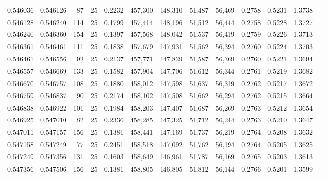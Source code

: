 \begin{tabular}{rrrrrrrrrrrrr}
0.546036 & 0.546126 &    87 &  25 &                                     0.2232 & 457,300 & 148,310 &  51,487 &  56,469 & 0.2758 & 0.5231 & 1.3738 \\
0.546128 & 0.546240 &   114 &  25 &                                     0.1799 & 457,414 & 148,196 &  51,512 &  56,444 & 0.2758 & 0.5228 & 1.3727 \\
0.546240 & 0.546360 &   154 &  25 &                                     0.1397 & 457,568 & 148,042 &  51,537 &  56,419 & 0.2759 & 0.5226 & 1.3713 \\
0.546361 & 0.546461 &   111 &  25 &                                     0.1838 & 457,679 & 147,931 &  51,562 &  56,394 & 0.2760 & 0.5224 & 1.3703 \\
0.546461 & 0.546556 &    92 &  25 &                                     0.2137 & 457,771 & 147,839 &  51,587 &  56,369 & 0.2760 & 0.5221 & 1.3694 \\
0.546557 & 0.546669 &   133 &  25 &                                     0.1582 & 457,904 & 147,706 &  51,612 &  56,344 & 0.2761 & 0.5219 & 1.3682 \\
0.546670 & 0.546757 &   108 &  25 &                                     0.1880 & 458,012 & 147,598 &  51,637 &  56,319 & 0.2762 & 0.5217 & 1.3672 \\
0.546759 & 0.546837 &    90 &  25 &                                     0.2174 & 458,102 & 147,508 &  51,662 &  56,294 & 0.2762 & 0.5215 & 1.3664 \\
0.546838 & 0.546922 &   101 &  25 &                                     0.1984 & 458,203 & 147,407 &  51,687 &  56,269 & 0.2763 & 0.5212 & 1.3654 \\
0.546925 & 0.547010 &    82 &  25 &                                     0.2336 & 458,285 & 147,325 &  51,712 &  56,244 & 0.2763 & 0.5210 & 1.3647 \\
0.547011 & 0.547157 &   156 &  25 &                                     0.1381 & 458,441 & 147,169 &  51,737 &  56,219 & 0.2764 & 0.5208 & 1.3632 \\
0.547158 & 0.547249 &    77 &  25 &                                     0.2451 & 458,518 & 147,092 &  51,762 &  56,194 & 0.2764 & 0.5205 & 1.3625 \\
0.547249 & 0.547356 &   131 &  25 &                                     0.1603 & 458,649 & 146,961 &  51,787 &  56,169 & 0.2765 & 0.5203 & 1.3613 \\
0.547356 & 0.547506 &   156 &  25 &                                     0.1381 & 458,805 & 146,805 &  51,812 &  56,144 & 0.2766 & 0.5201 & 1.3599 \\

\end{tabular}
